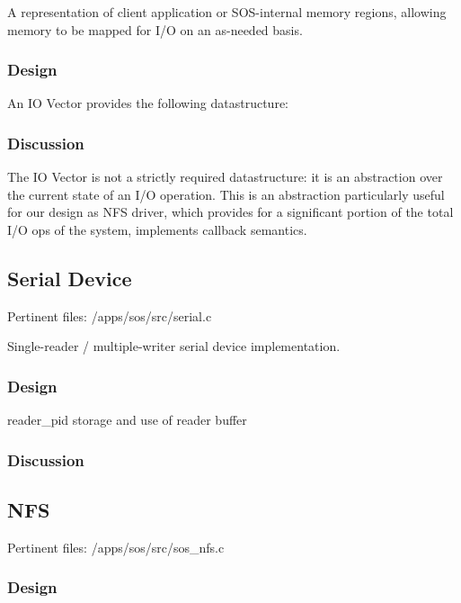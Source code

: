 \documentclass[a4paper,12pt]{article}
\begin{document}
A representation of client application or SOS-internal memory regions,
allowing memory to be mapped for I/O on an as-needed basis.

\subsubsection{Design}
An IO Vector provides the following datastructure:


\subsubsection{Discussion}
The IO Vector is not a strictly required datastructure: it is an abstraction
over the current state of an I/O operation.  This is an abstraction
particularly useful for our design as NFS driver, which provides for a
significant portion of the total I/O ops of the system, implements callback
semantics.

\subsection{Serial Device}
Pertinent files: /apps/sos/src/serial.c

Single-reader / multiple-writer serial device implementation.

\subsubsection{Design}
reader\_pid
storage and use of reader buffer

\subsubsection{Discussion}


\subsection{NFS}
Pertinent files: /apps/sos/src/sos\_nfs.c

\subsubsection{Design}
\end{document}

